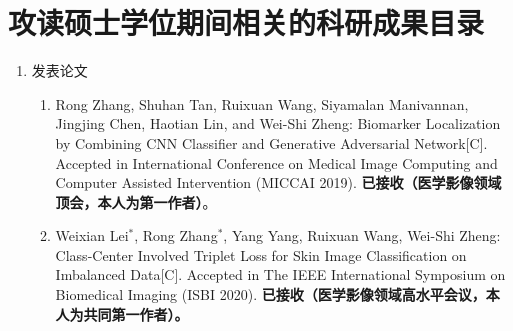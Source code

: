 \chapter{攻读硕士学位期间相关的科研成果目录}

\begin{enumerate}
	\item 发表论文
	\begin{enumerate}
		\item Rong Zhang, Shuhan Tan, Ruixuan Wang, Siyamalan Manivannan, Jingjing Chen, Haotian Lin, and Wei-Shi Zheng: Biomarker Localization by Combining CNN Classifier and Generative Adversarial Network[C]. Accepted in International Conference on Medical Image Computing and Computer Assisted Intervention (MICCAI 2019). \textbf{已接收（医学影像领域顶会，本人为第一作者）}。
		\item Weixian Lei$^*$, Rong Zhang$^*$, Yang Yang, Ruixuan Wang, Wei-Shi Zheng: Class-Center Involved Triplet Loss  for Skin Image Classification on Imbalanced Data[C]. Accepted in The IEEE International Symposium on Biomedical Imaging (ISBI 2020). \textbf{已接收（医学影像领域高水平会议，本人为共同第一作者）。}
	\end{enumerate}
	
\end{enumerate}